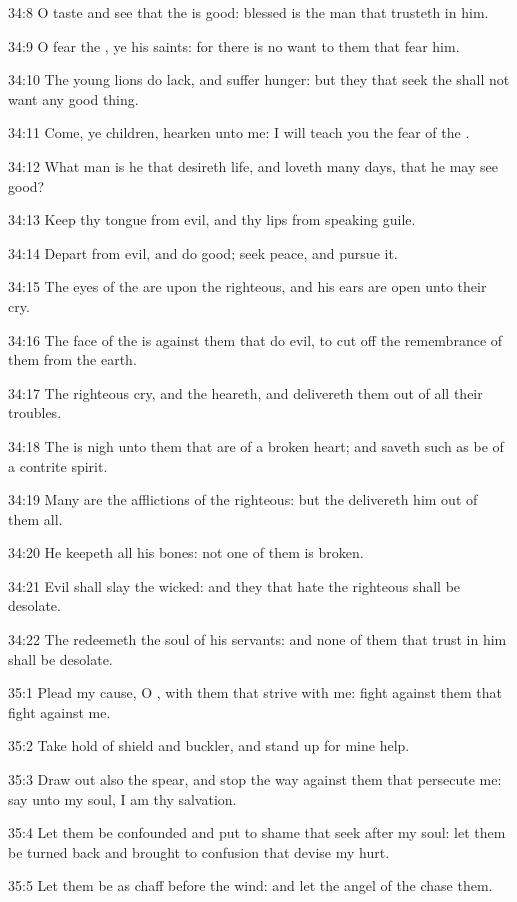 34:8 O taste and see that the \LORD is good: blessed is the man that trusteth in him.

34:9 O fear the \LORD, ye his saints: for there is no want to them that fear him.

34:10 The young lions do lack, and suffer hunger: but they that seek the \LORD shall not want any good thing.

34:11 Come, ye children, hearken unto me: I will teach you the fear of the \LORD.

34:12 What man is he that desireth life, and loveth many days, that he may see good?

34:13 Keep thy tongue from evil, and thy lips from speaking guile.

34:14 Depart from evil, and do good; seek peace, and pursue it.

34:15 The eyes of the \LORD are upon the righteous, and his ears are open unto their cry.

34:16 The face of the \LORD is against them that do evil, to cut off the remembrance of them from the earth.

34:17 The righteous cry, and the \LORD heareth, and delivereth them out of all their troubles.

34:18 The \LORD is nigh unto them that are of a broken heart; and saveth such as be of a contrite spirit.

34:19 Many are the afflictions of the righteous: but the \LORD delivereth him out of them all.

34:20 He keepeth all his bones: not one of them is broken.

34:21 Evil shall slay the wicked: and they that hate the righteous shall be desolate.

34:22 The \LORD redeemeth the soul of his servants: and none of them that trust in him shall be desolate.



35:1 Plead my cause, O \LORD, with them that strive with me: fight against them that fight against me.

35:2 Take hold of shield and buckler, and stand up for mine help.

35:3 Draw out also the spear, and stop the way against them that persecute me: say unto my soul, I am thy salvation.

35:4 Let them be confounded and put to shame that seek after my soul: let them be turned back and brought to confusion that devise my hurt.

35:5 Let them be as chaff before the wind: and let the angel of the \LORD chase them.

